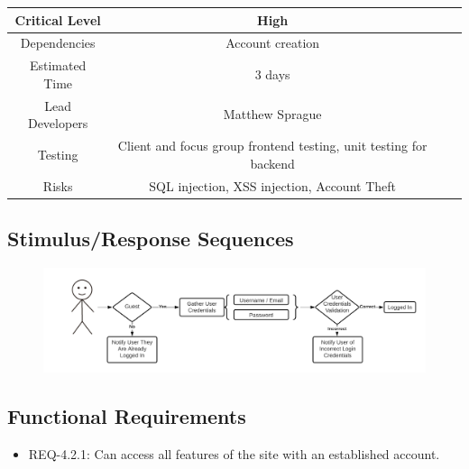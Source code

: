 \documentclass{scrreprt}
\begin{document}
\begin{center}
    \begin{tabular}{| c | c | c | c |}
        \hline
        Critical Level  & High                                                              \\
        \hline
        Dependencies    & Account creation                                                  \\
        \hline
        Estimated Time  & 3 days                                                            \\
        \hline
        Lead Developers & Matthew Sprague                             \\
        \hline
        Testing         & Client and focus group \gls{frontend} testing,
                          \gls{unit testing} for \gls{backend}                              \\
        \hline
        Risks           & \gls{SQL injection}, \gls{XSS injection}, Account Theft           \\
        \hline
    \end{tabular}
\end{center}

\subsection{Stimulus/Response Sequences}

\begin{figure}[H]\centering
    \includegraphics[width=\columnwidth]{FlowCharts/Security-Login.png}
\end{figure}

\subsection{\gls{Functional Requirements}}

\begin{itemize}
    \item REQ-4.2.1: Can access all features of the site with an established account.
\end{itemize}
\end{document}
